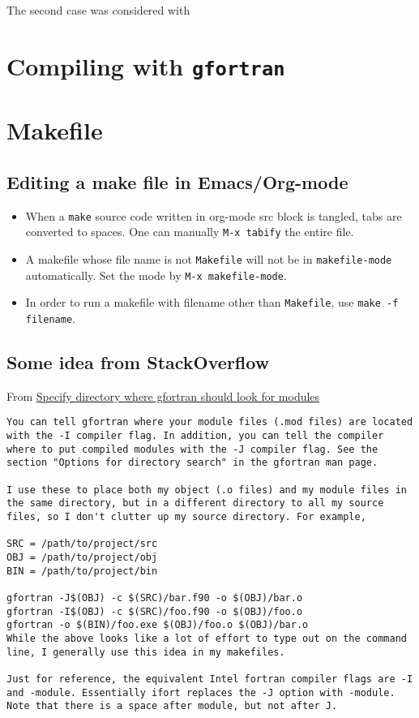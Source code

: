 \documentclass[11pt]{article}
\begin{document}
The second case was considered with
\section{Compiling with \texttt{gfortran}}
\label{sec:orgb0feddd}
\section{Makefile}
\label{sec:org3302c69}
\subsection{Editing a make file in Emacs/Org-mode}
\label{sec:org1f125b7}
\begin{itemize}
\item When a \texttt{make} source code written in org-mode src block is tangled,
tabs are converted to spaces. One can manually \texttt{M-x tabify} the
entire file.
\item A makefile whose file name is not \texttt{Makefile} will not be in \texttt{makefile-mode} automatically. Set the mode by \texttt{M-x makefile-mode}.
\item In order to run a makefile with filename other than \texttt{Makefile}, use \texttt{make -f filename}.
\end{itemize}

\subsection{Some idea from StackOverflow}
\label{sec:orgff454f0}
From \href{https://stackoverflow.com/questions/8855896/specify-directory-where-gfortran-should-look-for-modules}{Specify directory where gfortran should look for modules}

\begin{verbatim}
You can tell gfortran where your module files (.mod files) are located with the -I compiler flag. In addition, you can tell the compiler where to put compiled modules with the -J compiler flag. See the section "Options for directory search" in the gfortran man page.

I use these to place both my object (.o files) and my module files in the same directory, but in a different directory to all my source files, so I don't clutter up my source directory. For example,

SRC = /path/to/project/src
OBJ = /path/to/project/obj
BIN = /path/to/project/bin

gfortran -J$(OBJ) -c $(SRC)/bar.f90 -o $(OBJ)/bar.o
gfortran -I$(OBJ) -c $(SRC)/foo.f90 -o $(OBJ)/foo.o
gfortran -o $(BIN)/foo.exe $(OBJ)/foo.o $(OBJ)/bar.o
While the above looks like a lot of effort to type out on the command line, I generally use this idea in my makefiles.

Just for reference, the equivalent Intel fortran compiler flags are -I and -module. Essentially ifort replaces the -J option with -module. Note that there is a space after module, but not after J.
\end{verbatim}
\end{document}
